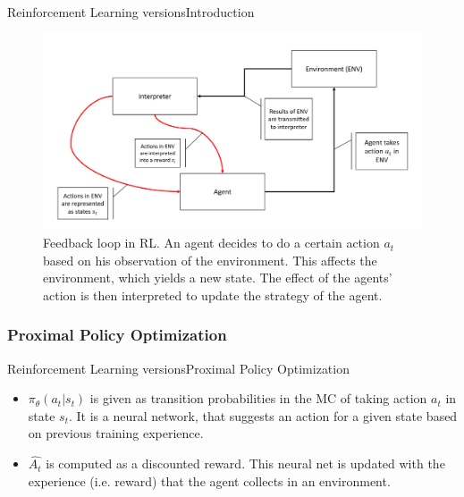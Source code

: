 \documentclass[10pt, aspectratio=169]{beamer}
\def\ab{Reinforcement Learning versions}
\def\aba{Introduction}
\def\abb{Proximal Policy Optimization}
\begin{document}
\begin{frame}{\ab}{\aba}
  \centering
    \begin{figure}
      \includegraphics[width = .8\textwidth]{Figures/RL schematic.PNG}
      \caption*{\tiny Feedback loop in RL. An agent decides to do a certain action $a_t$ based on his observation of the environment. This affects the environment, which yields a new state. The effect of the agents' action is then interpreted to update the strategy of the agent.}
    \end{figure}
\end{frame}

\subsubsection{\abb}


\begin{frame}{\ab}{\abb}
\begin{itemize}
  \item<3-> $\pi_{\theta}(a_t|s_t)$ is given as transition probabilities in the MC of taking action $a_t$ in state $s_t$. It is a neural network, that suggests an action for a given state based on previous training experience.
  \item<4-> $\hat{A_t}$ is computed as a discounted reward. This neural net is updated with the experience (i.e. reward) that the agent collects in an environment.
\end{itemize}
\end{frame}
\end{document}
